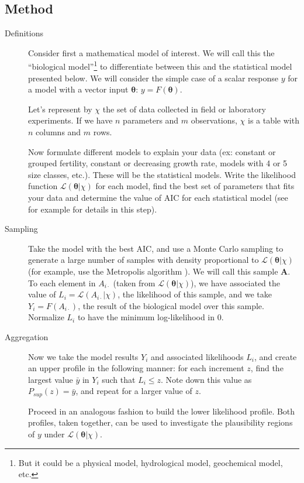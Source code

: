 \documentclass[twoside,12pt,a4paper]{article}
\newcommand{\bu}[1]{\mbox{$\mathbf{#1}$}}
\begin{document}
\subsection{Method}
\begin{description}
	\item[Definitions]
    Consider first a mathematical model of interest. We will call this the ``biological model''\footnote{
    But it could be a physical model, hydrological model, geochemical model, etc.}
    to differentiate between this and the statistical model presented below. We will consider the simple
    case of a scalar response $y$ for a model with a vector input $\bu{\theta}$: 
		$y = F(\bu{\theta})$.

    Let's represent by $\chi$ the set of data collected in field or laboratory experiments. If we have
    $n$ parameters and $m$ observations, $\chi$ is a table with $n$ columns and $m$ rows.

    Now formulate different models to explain your data (ex: constant or grouped fertility, constant or
    decreasing growth rate, models with 4 or 5 size classes, etc.). These will be the statistical models.
    Write the likelihood function $\mathcal{L}(\bu{\theta}|\chi)$ for each model, find the best
    set of parameters that fits your data and determine the value of AIC for each statistical model
    (see for example \citep{Burnham02} for details in this step). 
	\item[Sampling]
    Take the model with the best AIC, and use a Monte Carlo sampling to generate a large number of 
    samples with density proportional to 
    $\mathcal{L}(\bu{\theta}|\chi)$ (for example, use the Metropolis algorithm \citep{Tierney94}). 
    We will call this sample $\bu{A}$. To each element in 
    $A_{i \cdot}$ (taken from $\mathcal{L}(\bu{\theta}|\chi)$), we have associated the value of 
		$L_i = \mathcal{L}(A_{i \cdot} | \chi)$, the likelihood of this sample, and we take
		$Y_i = F(A_{i \cdot})$, the result of the biological model over this sample.
		Normalize $L_i$ to have the minimum log-likelihood in $0$.
	\item[Aggregation]
    Now we take the model results $Y_i$ and associated likelihoods $L_i$, and create an upper profile
    in the following manner: for each increment $z$, find the largest value 
		$\bar y$ in $Y_i$ such that $L_i \leq z$. Note down this value as $P_{sup}(z) = \bar y$,
    and repeat for a larger value of $z$.

    Proceed in an analogous fashion to build the lower likelihood profile. Both profiles, taken together,
    can be used to investigate the plausibility regions of $y$ under $\mathcal{L}(\bu{\theta}|\chi)$.
\end{description}
\end{document}
